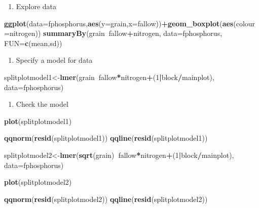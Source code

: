 \documentclass[]{book}
\newenvironment{Shaded}{\begin{snugshade}}{\end{snugshade}}
\newcommand{\KeywordTok}[1]{\textcolor[rgb]{0.13,0.29,0.53}{\textbf{#1}}}
\newcommand{\DataTypeTok}[1]{\textcolor[rgb]{0.13,0.29,0.53}{#1}}
\newcommand{\DecValTok}[1]{\textcolor[rgb]{0.00,0.00,0.81}{#1}}
\newcommand{\OperatorTok}[1]{\textcolor[rgb]{0.81,0.36,0.00}{\textbf{#1}}}
\newcommand{\NormalTok}[1]{#1}
\providecommand{\tightlist}{%
  \setlength{\itemsep}{0pt}\setlength{\parskip}{0pt}}
\theoremstyle{definition}
\theoremstyle{definition}
\theoremstyle{definition}
\theoremstyle{remark}
\begin{document}
\begin{enumerate}
\def\labelenumi{\arabic{enumi}.}
\setcounter{enumi}{3}
\tightlist
\item
  Explore data
\end{enumerate}

\begin{Shaded}
\begin{Highlighting}[]
\KeywordTok{ggplot}\NormalTok{(}\DataTypeTok{data=}\NormalTok{fphosphorus,}\KeywordTok{aes}\NormalTok{(}\DataTypeTok{y=}\NormalTok{grain,}\DataTypeTok{x=}\NormalTok{fallow))}\OperatorTok{+}\KeywordTok{geom_boxplot}\NormalTok{(}\KeywordTok{aes}\NormalTok{(}\DataTypeTok{colour=}\NormalTok{nitrogen))}
\KeywordTok{summaryBy}\NormalTok{(grain}\OperatorTok{~}\NormalTok{fallow}\OperatorTok{+}\NormalTok{nitrogen, }\DataTypeTok{data=}\NormalTok{fphosphorus, }\DataTypeTok{FUN=}\KeywordTok{c}\NormalTok{(mean,sd))}
\end{Highlighting}
\end{Shaded}

\begin{enumerate}
\def\labelenumi{\arabic{enumi}.}
\setcounter{enumi}{4}
\tightlist
\item
  Specify a model for data
\end{enumerate}

\begin{Shaded}
\begin{Highlighting}[]
\NormalTok{splitplotmodel1<-}\KeywordTok{lmer}\NormalTok{(grain}\OperatorTok{~}\NormalTok{fallow}\OperatorTok{*}\NormalTok{nitrogen}\OperatorTok{+}\NormalTok{(}\DecValTok{1}\OperatorTok{|}\NormalTok{block}\OperatorTok{/}\NormalTok{mainplot), }\DataTypeTok{data=}\NormalTok{fphosphorus)}
\end{Highlighting}
\end{Shaded}

\begin{enumerate}
\def\labelenumi{\arabic{enumi}.}
\setcounter{enumi}{5}
\tightlist
\item
  Check the model
\end{enumerate}

\begin{Shaded}
\begin{Highlighting}[]
\KeywordTok{plot}\NormalTok{(splitplotmodel1)}

\KeywordTok{qqnorm}\NormalTok{(}\KeywordTok{resid}\NormalTok{(splitplotmodel1))}
\KeywordTok{qqline}\NormalTok{(}\KeywordTok{resid}\NormalTok{(splitplotmodel1))}

\NormalTok{splitplotmodel2<-}\KeywordTok{lmer}\NormalTok{(}\KeywordTok{sqrt}\NormalTok{(grain)}\OperatorTok{~}\NormalTok{fallow}\OperatorTok{*}\NormalTok{nitrogen}\OperatorTok{+}\NormalTok{(}\DecValTok{1}\OperatorTok{|}\NormalTok{block}\OperatorTok{/}\NormalTok{mainplot), }\DataTypeTok{data=}\NormalTok{fphosphorus)}

\KeywordTok{plot}\NormalTok{(splitplotmodel2)}

\KeywordTok{qqnorm}\NormalTok{(}\KeywordTok{resid}\NormalTok{(splitplotmodel2))}
\KeywordTok{qqline}\NormalTok{(}\KeywordTok{resid}\NormalTok{(splitplotmodel2))}
\end{Highlighting}
\end{Shaded}
\end{document}

